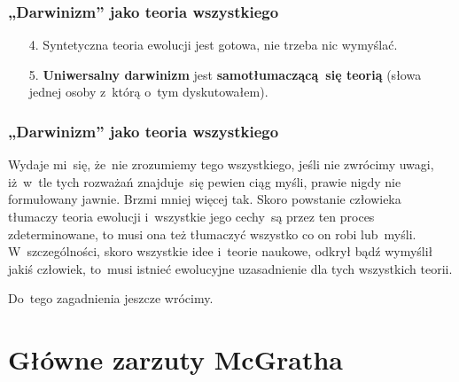 \documentclass[10pt,t]{beamer}
\begin{document}
\begin{frame}
  \frametitle{„Darwinizm” jako teoria wszystkiego}


  \begin{enumerate}

  \item[4.] Syntetyczna teoria ewolucji jest gotowa, nie trzeba nic
    wymyślać.

  \item[5.] \textbf{Uniwersalny darwinizm} jest \textbf{samotłumaczącą~się
      teorią} (słowa jednej osoby z~którą o~tym dyskutowałem).

  \end{enumerate}

\end{frame}





\begin{frame}
  \frametitle{„Darwinizm” jako teoria wszystkiego}


  Wydaje mi~się, że~nie zrozumiemy tego wszystkiego, jeśli nie
  zwrócimy uwagi, iż~w~tle tych rozważań znajduje~się pewien ciąg
  myśli, prawie nigdy nie formułowany jawnie. Brzmi mniej więcej
  tak. Skoro powstanie człowieka tłumaczy teoria ewolucji
  i~wszystkie jego cechy~są przez ten proces zdeterminowane, to musi
  ona też tłumaczyć wszystko co on robi lub~myśli. W~szczególności,
  skoro wszystkie idee i~teorie naukowe, odkrył bądź wymyślił jakiś
  człowiek, to~musi istnieć ewolucyjne uzasadnienie dla tych
  wszystkich teorii.

  Do~tego zagadnienia jeszcze wrócimy.

\end{frame}










\section{Główne zarzuty McGratha}
\end{document}
